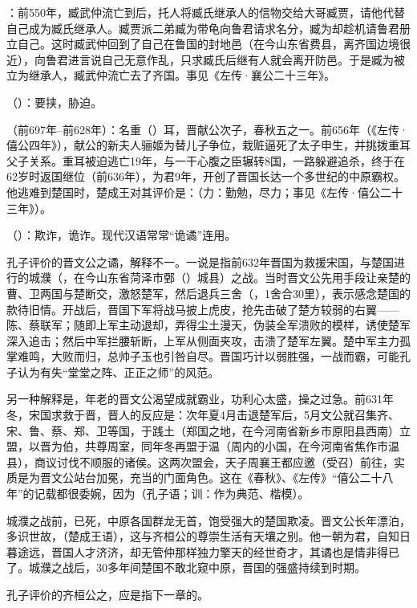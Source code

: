 {
\item {}：前550年，臧武仲流亡到后，托人将臧氏继承人的信物交给大哥臧贾，请他代替自己成为臧氏继承人。臧贾派二弟臧为带龟向鲁君请求名分，臧为却趁机请鲁君册立自己。这时臧武仲回到了自己在鲁国的封地邑（在今山东省费县，离齐国边境很近），向鲁君进言说自己无意作乱，只求臧氏后继有人就会离开防邑。于是臧为被立为继承人，臧武仲流亡去了齐国。事见《左传·襄公二十三年》。
\item {}（）：要挟，胁迫。
}
{}


{
\item {}（前697年--前628年）：名重（）耳，晋献公次子，春秋五之一。前656年（《左传·僖公四年》），献公的新夫人骊姬为替儿子争位，栽赃逼死了太子申生，并挑拨重耳父子关系。重耳被迫逃亡19年，与一干心腹之臣辗转8国，一路躲避追杀，终于在62岁时返国继位（前636年），为君9年，开创了晋国长达一个多世纪的中原霸权。他逃难到楚国时，楚成王对其评价是：（力：勤勉，尽力；事见《左传·僖公二十三年》）。

\item {}（）：欺诈，诡诈。现代汉语常常“诡谲”连用。

孔子评价的晋文公之谲，解释不一。一说是指前632年晋国为救援宋国，与楚国进行的城濮（，在今山东省菏泽市鄄（）城县）之战。当时晋文公先用手段让亲楚的曹、卫两国与楚断交，激怒楚军，然后退兵三舍（，1舍合30里），表示感念楚国的款待旧情。开战后，晋国下军将战马披上虎皮，抢先击破了楚方较弱的右翼——陈、蔡联军；随即上军主动退却，弄得尘土漫天，伪装全军溃败的模样，诱使楚军深入追击；然后中军拦腰斩断，上军从侧面夹攻，击溃了楚军左翼。楚中军主力孤掌难鸣，大败而归，总帅子玉也引咎自尽。晋国巧计以弱胜强，一战而霸，可能孔子认为有失“堂堂之阵、正正之师”的风范。

另一种解释是，年老的晋文公渴望成就霸业，功利心太盛，操之过急。前631年冬，宋国求救于晋，晋人的反应是：次年夏4月击退楚军后，5月文公就召集齐、宋、鲁、蔡、郑、卫等国，于践土（郑国之地，在今河南省新乡市原阳县西南）立盟，以晋为伯，共尊周室，同年冬再盟于温（周内的小国，在今河南省焦作市温县），商议讨伐不顺服的诸侯。这两次盟会，天子周襄王都应邀（受召）前往，实质是为晋文公站台加冕，充当的门面角色。这在《春秋》、《左传》“僖公二十八年”的记载都很委婉，因为（孔子语；训：作为典范、楷模）。

城濮之战前，已死，中原各国群龙无首，饱受强大的楚国欺凌。晋文公长年漂泊，多识世故，（楚成王语），这与齐桓公的尊崇生活有天壤之别。他一朝为君，自知日暮途远，晋国人才济济，却无管仲那样独力擎天的经世奇才，其谲也是情非得已了。城濮之战后，30多年间楚国不敢北窥中原，晋国的强盛持续到时期。

\item 孔子评价的齐桓公之，应是指下一章的。
}
